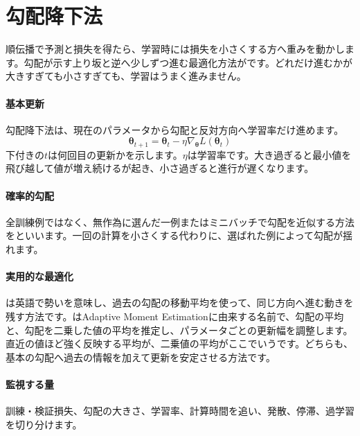 \par
\endgroup
\par
\endgroup


\section{勾配降下法}
\label{sec:06-machine-learning-19}

順伝播で予測と損失を得たら、学習時には損失を小さくする方へ重みを動かします。勾配が示す上り坂と逆へ少しずつ進む最適化方法がです。どれだけ進むかが大きすぎても小さすぎても、学習はうまく進みません。

\begingroup
\begingroup
\paragraph{基本更新}
        勾配降下法は、現在のパラメータから勾配と反対方向へ学習率だけ進めます。
        \[
          \boldsymbol{\theta}_{t+1}
          =\boldsymbol{\theta}_{t}
          -\eta\nabla_{\boldsymbol{\theta}}
          L(\boldsymbol{\theta}_{t})
        \]
        下付きの$t$は何回目の更新かを示します。$\eta$は学習率です。大き過ぎると最小値を飛び越して値が増え続けるが起き、小さ過ぎると進行が遅くなります。

\paragraph{確率的勾配}
        全訓練例ではなく、無作為に選んだ一例またはミニバッチで勾配を近似する方法をといいます。一回の計算を小さくする代わりに、選ばれた例によって勾配が揺れます。

\par
\endgroup
\medskip
\begingroup
\paragraph{実用的な最適化}
        は英語で勢いを意味し、過去の勾配の移動平均を使って、同じ方向へ進む動きを残す方法です。はAdaptive Moment Estimationに由来する名前で、勾配の平均と、勾配を二乗した値の平均を推定し、パラメータごとの更新幅を調整します。直近の値ほど強く反映する平均が、二乗値の平均がここでいうです。どちらも、基本の勾配へ過去の情報を加えて更新を安定させる方法です。

\paragraph{監視する量}
        訓練・検証損失、勾配の大きさ、学習率、計算時間を追い、発散、停滞、過学習を切り分けます。

